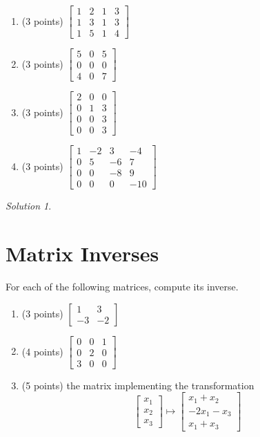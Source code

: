 \documentclass{article}
\theoremstyle{remark}
\newtheorem*{solution}{Solution}
\begin{document}
\begin{enumerate}
\item (3 points)
  $
  \begin{bmatrix}
    1 & 2 & 1 & 3 \\
    1 & 3 & 1 & 3 \\
    1 & 5 & 1 & 4
  \end{bmatrix}
  $
\item (3 points)
  $
  \begin{bmatrix}
    5 & 0 & 5 \\
    0 & 0 & 0 \\
    4 & 0 & 7
  \end{bmatrix}
  $
\item (3 points)
  $
  \begin{bmatrix}
    2 & 0 & 0 \\
    0 & 1 & 3 \\
    0 & 0 & 3 \\
    0 & 0 & 3
  \end{bmatrix}
  $
\item (3 points)
  $
  \begin{bmatrix}
    1 & -2 & 3 & -4 \\
    0 & 5 & -6 &  7 \\
    0 & 0 & -8 & 9 \\
    0 & 0 & 0 & -10
  \end{bmatrix}
  $
\end{enumerate}
\medskip

\begin{solution}
\end{solution}

\pagebreak
\section{Matrix Inverses}
For each of the following matrices, compute its inverse.
\begin{enumerate}
\item (3 points) $\begin{bmatrix} 1 & 3 \\ -3 & -2 \end{bmatrix}$
\item (4 points) $\begin{bmatrix} 0 & 0 & 1 \\ 0 & 2 & 0 \\ 3 & 0 & 0 \end{bmatrix}$
\item (5 points) the matrix implementing the transformation
  \begin{displaymath}
    \begin{bmatrix}
      x_1 \\ x_2 \\ x_3
    \end{bmatrix}
    \mapsto
    \begin{bmatrix}
      x_1 + x_2 \\
      -2x_1 - x_3 \\
      x_1 + x_3
    \end{bmatrix}
  \end{displaymath}
\end{enumerate}
\end{document}

